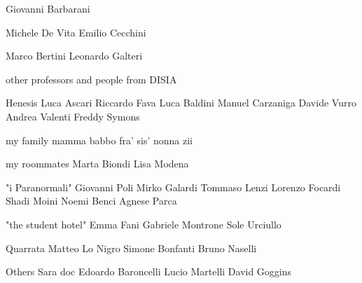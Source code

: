 \label{chap:Acknowledgement}

Giovanni Barbarani

Michele De Vita
Emilio Cecchini

Marco Bertini
Leonardo Galteri

other professors and people from DISIA

Henesis
Luca Ascari
Riccardo Fava
Luca Baldini
Manuel Carzaniga
Davide Vurro
Andrea Valenti
Freddy Symons

my family
mamma
babbo
fra'
sis'
nonna
zii

my roommates
Marta Biondi
Lisa Modena

"i Paranormali"
Giovanni Poli
Mirko Galardi
Tommaso Lenzi
Lorenzo Focardi
Shadi Moini
Noemi Benci
Agnese Parca

"the student hotel"
Emma Fani
Gabriele Montrone
Sole Urciullo

Quarrata
Matteo Lo Nigro
Simone Bonfanti
Bruno Naselli

Others
Sara doc
Edoardo Baroncelli
Lucio Martelli
David Goggins

